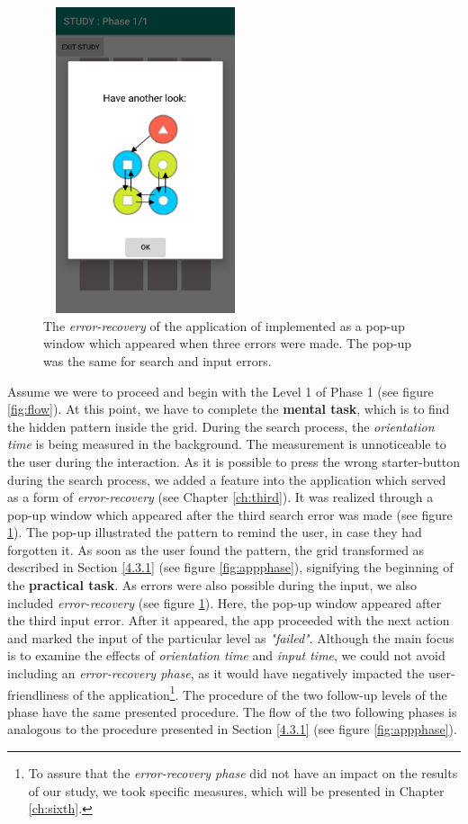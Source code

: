 \begin{figure}[t!]
\centering
\includegraphics[width=6cm, height=9cm]{Chapters/graphics/error.jpg}
\caption{The \textit{error-recovery} of the application of implemented as a pop-up window which appeared when three errors were made. The pop-up was the same for search and input errors.}
\label{fig:errorpopup}
\end{figure}

Assume we were to proceed and begin with the Level 1 of Phase 1 (see figure \ref{fig:flow}). At this point, we have to complete the \textbf{mental task}, which is to find the hidden pattern inside the grid. During the search process, the \textit{orientation time} is being measured in the background. The measurement is unnoticeable to the user during the interaction. As it is possible to press the wrong starter-button during the search process, we added a feature into the application which served as a form of \textit{error-recovery} (see Chapter \ref{ch:third}). It was realized through a pop-up window which appeared after the third search error was made (see figure \ref{fig:errorpopup}). The pop-up illustrated the pattern to remind the user, in case they had forgotten it. As soon as the user found the pattern, the grid transformed as described in Section \ref{4.3.1} (see figure \ref{fig:appphase}), signifying the beginning of the \textbf{practical task}. As errors were also possible during the input, we also included \textit{error-recovery} (see figure \ref{fig:errorpopup}). Here, the pop-up window appeared after the third input error. After it appeared, the app proceeded with the next action and marked the input of the particular level as \textit{"failed"}. Although the main focus is to examine the effects of \textit{orientation time} and \textit{input time}, we could not avoid including an \textit{error-recovery phase}, as it would have negatively impacted the user-friendliness of the application\footnote{To assure that the \textit{error-recovery phase} did not have an impact on the results of our study, we took specific measures, which will be presented in Chapter \ref{ch:sixth}.}. The procedure of the two follow-up levels of the phase have the same presented procedure. The flow of the two following phases is analogous to the procedure presented in Section \ref{4.3.1} (see figure \ref{fig:appphase}).  \\





